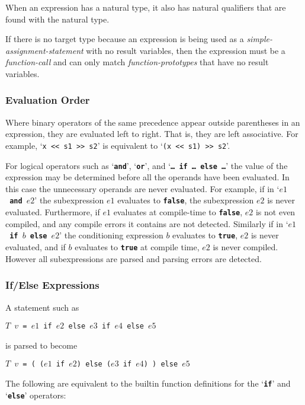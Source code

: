 \documentclass[12pt]{article}
\newcommand{\TT}[1]{{\tt \bfseries #1}}
\begin{document}
When an expression has a natural type, it also has natural qualifiers
that are found with the natural type.

If there is no target type because an expression is being used
as a {\em simple-assignment-statement} with no result variables, then
the expression must be a {\em function-call} and can only match
{\em function-prototypes} that have no result variables.

\subsubsection{Evaluation Order}
\label{EVALUATION-ORDER}

Where binary operators of the same precedence appear outside
parentheses in an expression, they are evaluated left to right.
That is, they are left associative.  For example,
`{\tt x <{}< s1 >{}> s2}' is
equivalent to `{\tt (x <{}< s1) >{}> s2}'.

For logical operators such as `\TT{and}', `\TT{or}', and
`\TT{\ldots{}~if~\ldots{}~else~\ldots{}}' the value of the expression
may be determined before all the operands have been evaluated.
In this case the unnecessary operands are never evaluated.
For example, if in `\TT{$e1$~and~$e2$}' the subexpression $e1$
evaluates to \TT{false}, the subexpression $e2$ is never evaluated.
Furthermore, if $e1$ evaluates at compile-time to \TT{false},
$e2$ is not even compiled, and any compile errors it contains
are not detected.  Similarly if in `\TT{$e1$~if~$b$~else~$e2$}' the
conditioning expression $b$ evaluates to \TT{true}, $e2$ is
never evaluated, and if $b$ evaluates to \TT{true} at compile
time, $e2$ is never compiled.  However all subexpressions are parsed and
parsing errors are detected.

\subsubsection{If/Else Expressions}

A statement such as
\begin{center}
\tt $T$ $v$ = $e1$ if $e2$ else $e3$ if $e4$ else $e5$
\end{center}
is parsed to become
\begin{center}
\tt $T$ $v$ = ( ($e1$ if $e2$) else ($e3$ if $e4$) ) else $e5$
\end{center}

The following are equivalent to the builtin function definitions for
the `\TT{if}' and `\TT{else}' operators:
\end{document}
